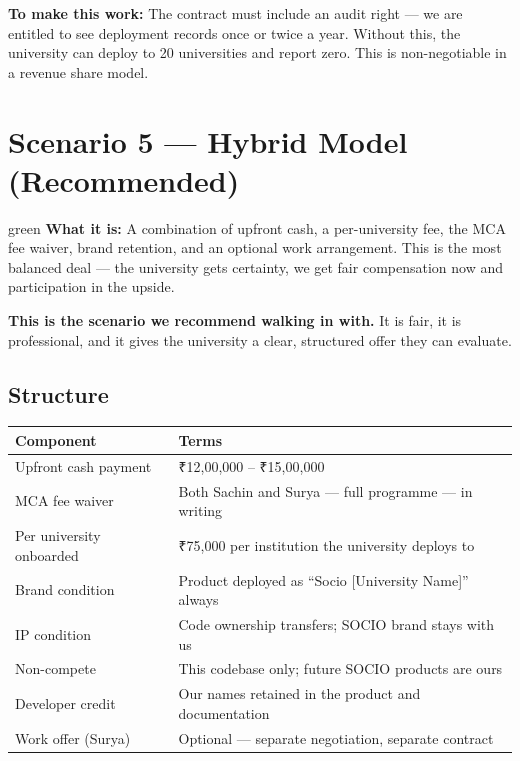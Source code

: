 \documentclass[12pt,a4paper]{article}
\begin{document}
    \begin{infobox}
    \textbf{To make this work:} The contract must include an audit right — we are entitled to see deployment records once or twice a year. Without this, the university can deploy to 20 universities and report zero. This is non-negotiable in a revenue share model.
    \end{infobox}

    \newpage
    \section{Scenario 5 — Hybrid Model (Recommended)}

    \begin{scenariobox}{green}
    \textbf{What it is:} A combination of upfront cash, a per-university fee, the MCA fee waiver, brand retention, and an optional work arrangement. This is the most balanced deal — the university gets certainty, we get fair compensation now and participation in the upside.
    \end{scenariobox}

    \vspace{0.4cm}

    \begin{recommendbox}
    \textbf{This is the scenario we recommend walking in with.} It is fair, it is professional, and it gives the university a clear, structured offer they can evaluate.
    \end{recommendbox}

    \vspace{0.4cm}

    \subsection*{Structure}

    \begin{tabularx}{\textwidth}{L{5cm} X}
    \toprule
    \textbf{Component} & \textbf{Terms} \\
    \midrule
    Upfront cash payment & ₹12,00,000 – ₹15,00,000 \\
    MCA fee waiver & Both Sachin and Surya — full programme — in writing \\
    Per university onboarded & ₹75,000 per institution the university deploys to \\
    Brand condition & Product deployed as ``Socio [University Name]'' always \\
    IP condition & Code ownership transfers; SOCIO brand stays with us \\
    Non-compete & This codebase only; future SOCIO products are ours \\
    Developer credit & Our names retained in the product and documentation \\
    Work offer (Surya) & Optional — separate negotiation, separate contract \\
    \bottomrule
    \end{tabularx}
\end{document}
